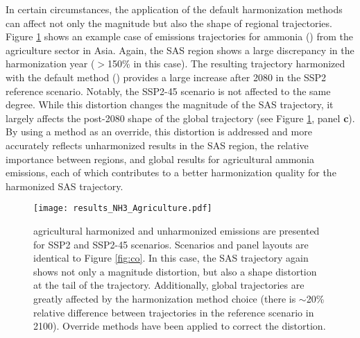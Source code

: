In certain circumstances, the application of the default harmonization methods
can affect not only the magnitude but also the shape of regional
trajectories. Figure \ref{fig:nh3} shows an example case of emissions
trajectories for ammonia (\nht) from the agriculture sector in Asia. Again, the
SAS region shows a large discrepancy in the harmonization year ($>$150\% in
this case). The resulting trajectory harmonized with the default method
() provides a large increase after 2080 in the SSP2
reference scenario. Notably, the SSP2-45 scenario is not affected to the same
degree. While this distortion changes the magnitude of the SAS trajectory, it
% 
% 
largely affects the post-2080 shape of the global trajectory (see Figure
\ref{fig:nh3}, panel \textbf{c}). By using a  method as an
override, this distortion is addressed and more accurately reflects unharmonized
results in the SAS region, the relative importance between regions, and global
results for agricultural ammonia emissions, each of which contributes to a
better harmonization quality for the harmonized SAS trajectory.

\begin{figure}
  \begin{center}
    \texttt{[image: results\_NH3\_Agriculture.pdf]}
    \caption[]{
      \label{fig:nh3}
      \nhtt agricultural harmonized and unharmonized emissions are presented for
      SSP2 and SSP2-45 scenarios. Scenarios and panel layouts are identical to
      Figure \ref{fig:co}. In this case, the SAS trajectory again shows not only
      a magnitude distortion, but also a shape distortion at the tail of the
      trajectory. Additionally, global trajectories are greatly affected by the
      harmonization method choice (there is $\sim$20\% relative difference
      between trajectories in the reference scenario in 2100). Override methods
      have been applied to correct the distortion.  }
  \end{center}
\end{figure}


